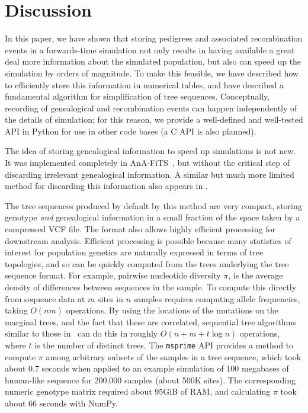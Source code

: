 \documentclass{article}
\newcommand{\msprime}{\texttt{msprime}}
\begin{document}
\section*{Discussion}

In this paper, we have shown that storing pedigrees
and associated recombination events
in a forwards-time simulation
not only results in having available a great deal more information about the simulated population,
but also can speed up the simulation by orders of magnitude.
To make this feasible,
we have described how to efficiently store this information in numerical tables,
and have described a fundamental algorithm for simplification of tree sequences.
Conceptually, recording of genealogical and recombination events
can happen independently of the details of simulation;
for this reason, we provide a well-defined and well-tested API in Python
for use in other code bases (a C API is also planned).

The idea of storing genealogical information to speed up simulations is not new.
It was implemented completely in AnA-FiTS~\citep{aberer2013rapid},
but without the critical step of discarding irrelevant genealogical information.
A similar but much more limited method for
discarding this information also appears in \citet{padhukasahasram2008exploring}.

The tree sequences produced by default by this method
are very compact, storing genotype \emph{and} genealogical information
in a small fraction of the space taken by a compressed VCF file.
The format also allows highly efficient processing for downstream analysis.
Efficient processing is possible because many statistics of interest for population genetics
are naturally expressed in terms of tree topologies,
and so can be quickly computed from the trees underlying the tree sequence format.
For example, pairwise nucleotide diversity $\pi$, is the average density of
differences between sequences in the sample.
To compute this directly from sequence data at $m$ sites in $n$ samples
requires computing allele frequencies, taking $O(nm)$ operations.
By using the locations of the mutations on the marginal trees,
and the fact that these are correlated,
sequential tree algorithms similar to those in~\citep{kelleher2016efficient}
can do this in roughly $O(n + m + t \log n)$ operations, where
$t$ is the number of distinct trees.
The \msprime{} API provides a method to compute $\pi$ among arbitrary subsets of the
samples in a tree sequence, which took about 0.7 seconds when
applied to an example simulation of 100 megabases of human-like
sequence for 200,000 samples (about 500K sites). The corresponding
numeric genotype matrix required about 95GiB of RAM, and
calculating $\pi$ took about 66 seconds with NumPy.
\end{document}
